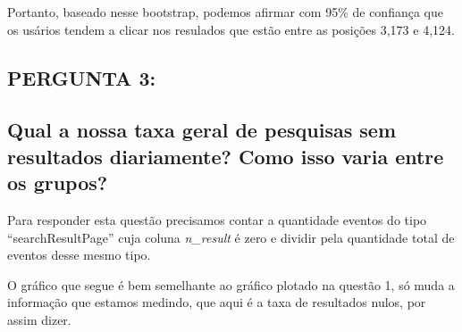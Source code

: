 \documentclass[]{article}
\newenvironment{Shaded}{\begin{snugshade}}{\end{snugshade}}
\newcommand{\KeywordTok}[1]{\textcolor[rgb]{0.13,0.29,0.53}{\textbf{#1}}}
\newcommand{\DataTypeTok}[1]{\textcolor[rgb]{0.13,0.29,0.53}{#1}}
\newcommand{\DecValTok}[1]{\textcolor[rgb]{0.00,0.00,0.81}{#1}}
\newcommand{\StringTok}[1]{\textcolor[rgb]{0.31,0.60,0.02}{#1}}
\newcommand{\OperatorTok}[1]{\textcolor[rgb]{0.81,0.36,0.00}{\textbf{#1}}}
\newcommand{\NormalTok}[1]{#1}
\begin{document}
Portanto, baseado nesse bootstrap, podemos afirmar com 95\% de confiança
que os usários tendem a clicar nos resulados que estão entre as posições
3,173 e 4,124.

\subsection{PERGUNTA 3:}\label{pergunta-3}

\subsection{Qual a nossa taxa geral de pesquisas sem resultados
diariamente? Como isso varia entre os
grupos?}\label{qual-a-nossa-taxa-geral-de-pesquisas-sem-resultados-diariamente-como-isso-varia-entre-os-grupos}

Para responder esta questão precisamos contar a quantidade eventos do
tipo ``searchResultPage'' cuja coluna \emph{n\_result} é zero e dividir
pela quantidade total de eventos desse mesmo tipo.

O gráfico que segue é bem semelhante ao gráfico plotado na questão 1, só
muda a informação que estamos medindo, que aqui é a taxa de resultados
nulos, por assim dizer.

\begin{Shaded}
\end{Shaded}
\end{document}
